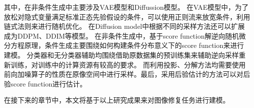 其中，在非条件生成中主要涉及VAE模型和Diffussion模型。 在VAE模型中，为了放松对隐式变量满足标准正态先验假设的条件，可以使用正则流来放宽条件，利用链式法则来进行随机优化。 
在Diffusion model中根据不同的采样方法还可以扩展成为DDPM、DDIM等模型。     
在非条件生成中，基于score function解逆向随机微分方程原理，条件生成主要围绕如何构建条件分布意义下的score function来进行建模。 分类器和无分类器辅助均围绕借助原数据集的预训练集来辅助逆向采样重新训练，对训练中的计算资源有较高的要求。 而利用投影、分解方法均需要使用前向加噪算子的性质在原像空间中进行采样。最后，采用后验估计的方法可以对后验score function进行估计。    

在接下来的章节中，本文将基于以上研究成果来对图像修复任务进行建模。 



